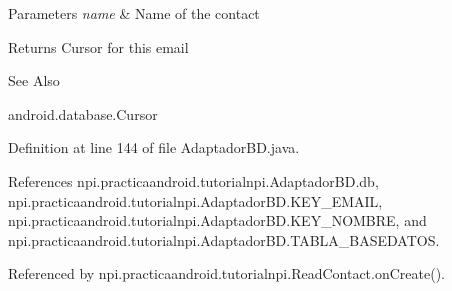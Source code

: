 \begin{DoxyParams}{Parameters}
{\em name} & Name of the contact \\
\hline
\end{DoxyParams}
\begin{DoxyReturn}{Returns}
Cursor for this email 
\end{DoxyReturn}
\begin{DoxySeeAlso}{See Also}


android.\-database.\-Cursor 
\end{DoxySeeAlso}


Definition at line 144 of file Adaptador\-B\-D.\-java.



References npi.\-practicaandroid.\-tutorialnpi.\-Adaptador\-B\-D.\-db, npi.\-practicaandroid.\-tutorialnpi.\-Adaptador\-B\-D.\-K\-E\-Y\-\_\-\-E\-M\-A\-I\-L, npi.\-practicaandroid.\-tutorialnpi.\-Adaptador\-B\-D.\-K\-E\-Y\-\_\-\-N\-O\-M\-B\-R\-E, and npi.\-practicaandroid.\-tutorialnpi.\-Adaptador\-B\-D.\-T\-A\-B\-L\-A\-\_\-\-B\-A\-S\-E\-D\-A\-T\-O\-S.



Referenced by npi.\-practicaandroid.\-tutorialnpi.\-Read\-Contact.\-on\-Create().


